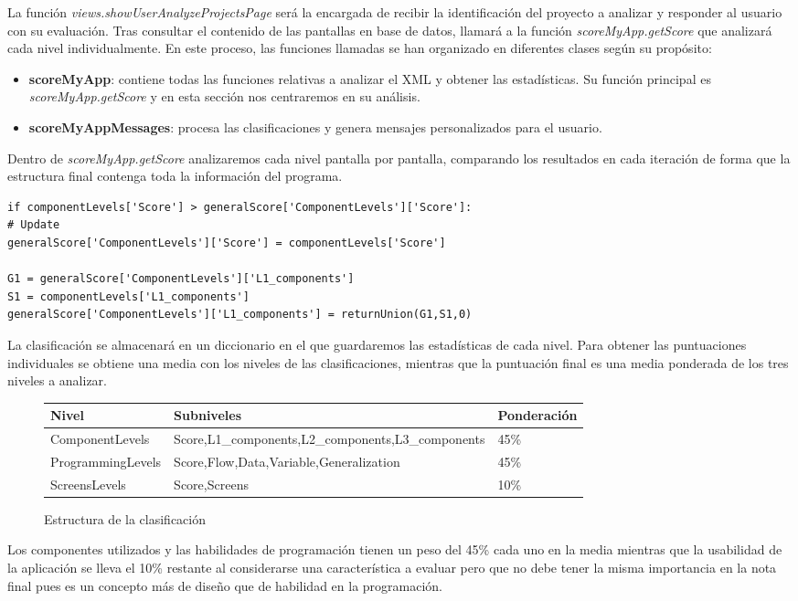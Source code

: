 \documentclass[a4paper, 12pt]{book}
\begin{document}
La función \textit{views.showUserAnalyzeProjectsPage} será la encargada de recibir la identificación del proyecto a analizar y responder al usuario con su evaluación. Tras consultar el contenido de las pantallas en base de datos, llamará a la función \textit{scoreMyApp.getScore} que analizará cada nivel individualmente. En este proceso, las funciones llamadas se han organizado en diferentes clases según su propósito:
\begin{itemize}
  \item \textbf{scoreMyApp}: contiene todas las funciones relativas a analizar el XML y obtener las estadísticas. Su función principal es \textit{scoreMyApp.getScore} y en esta sección nos centraremos en su análisis. 
  \item \textbf{scoreMyAppMessages}: procesa las clasificaciones y genera mensajes personalizados para el usuario.
\end{itemize}

Dentro de \textit{scoreMyApp.getScore} analizaremos cada nivel pantalla por pantalla, comparando los resultados en cada iteración de forma que la estructura final contenga toda la información del programa. 
\begin{lstlisting}
if componentLevels['Score'] > generalScore['ComponentLevels']['Score']:
# Update
generalScore['ComponentLevels']['Score'] = componentLevels['Score']

G1 = generalScore['ComponentLevels']['L1_components']
S1 = componentLevels['L1_components']
generalScore['ComponentLevels']['L1_components'] = returnUnion(G1,S1,0)
\end{lstlisting}
La clasificación se almacenará en un diccionario en el que guardaremos las estadísticas de cada nivel. Para obtener las puntuaciones individuales se obtiene una media con los niveles de las clasificaciones, mientras que la puntuación final es una media ponderada de los tres niveles a analizar. 
\begin{figure}
	\begin{center}
	    \begin{tabular}{| l | l | l | }
	    \hline
	    \textbf{Nivel} & \textbf{Subniveles} & \textbf{Ponderación} \\ \hline
	    ComponentLevels & Score,L1\_components,L2\_components,L3\_components & 45\% \\ \hline
	    ProgrammingLevels & Score,Flow,Data,Variable,Generalization & 45\% \\ \hline
	    ScreensLevels & Score,Screens & 10\% \\ \hline
            \end{tabular}
	\end{center}
	\caption{Estructura de la clasificación}
	\label{fig:scoreStructure}
\end{figure}
Los componentes utilizados y las habilidades de programación tienen un peso del 45\% cada uno en la media mientras que la usabilidad de la aplicación se lleva el 10\% restante al considerarse una característica a evaluar pero que no debe tener la misma importancia en la nota final pues es un concepto más de diseño que de habilidad en la programación.  
\end{document}
